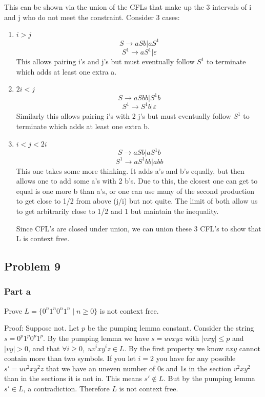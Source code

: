 \documentclass[english]{article}
\begin{document}
This can be shown via the union of the CFLs that make up the 3 intervals of i and j who do not meet the constraint. Consider 3 cases:
\begin{enumerate}
\item \(i > j\)
\[ S \rightarrow aSb | aS^1 \]
\[ S^1 \rightarrow aS^1 | \varepsilon \]
This allows pairing i's and j's but must eventually follow $S^1$ to terminate which adds at least one extra a.

\item \(2i < j\)
\[ S \rightarrow aSbb | S^1b \]
\[ S^1 \rightarrow S^1b | \varepsilon \]
Similarly this allows pairing i's with 2 j's but must eventually follow $S^1$ to terminate which adds at least one extra b.

\item \(i < j < 2i\)
\[ S \rightarrow  aSb | aS^1b \]
\[ S^1 \rightarrow  aS^1bb | abb \]
This one takes some more thinking. It adds a's and b's equally, but then allows one to add some a's with 2 b's. Due to this, the closest one can get to equal is one more b than a's, or one can use many of the second production to get close to 1/2 from above (j/i) but not quite. The limit of both allow us to get arbitrarily close to 1/2 and 1 but maintain the inequality.

Since CFL's are closed under union, we can union these 3 CFL's to show that L is context free.

\end{enumerate}

\subsection*{Problem 9}
\subsubsection*{Part a}
Prove \(L = \{0^n 1^n 0^n 1^n \mid n \ge 0\}\) is not context free.

Proof: Suppose not. Let $p$ be the pumping lemma constant. Consider the string $s = 0^p 1^p 0^p 1^p$. By the pumping lemma
we have $s = uvxyz$ with $|vxy| \le p$ and $|vy| > 0$, and that \(\forall i \ge 0,\; uv^ixy^iz \in L\). By the first property
we know $vxy$ cannot contain more than two symbols. If you let $i=2$ you have for any possible $s' = uv^2xy^2z$ that we have
an uneven number of 0s and 1s in the section $v^2xy^2$ than in the sections it is not in. This means $s' \notin L$.
But by the pumping lemma $s' \in L$, a contradiction. Therefore $L$ is not context free.
\end{document}
